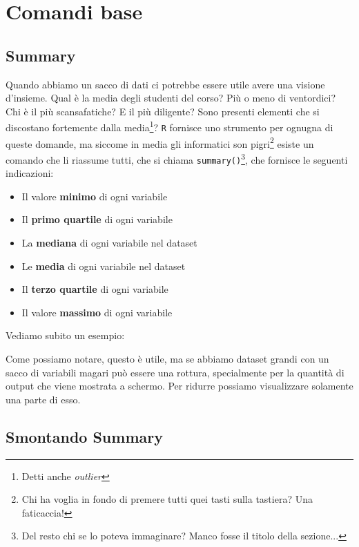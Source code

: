 \chapter{Comandi base}

\section{Summary}

Quando abbiamo un sacco di dati ci potrebbe essere utile avere una visione
d'insieme. Qual è la media degli studenti del corso? Più o meno di ventordici?
Chi è il più scansafatiche? E il più diligente? Sono presenti elementi che si
discostano fortemente dalla media\footnote{Detti anche \textit{outlier}}?
\texttt{R} fornisce uno strumento per ognugna di queste domande, ma siccome in
media gli informatici son pigri\footnote{Chi ha voglia in fondo di premere tutti
quei tasti sulla tastiera? Una faticaccia!} esiste un comando che li riassume
tutti, che si chiama \texttt{summary()}\footnote{Del resto chi se lo poteva
immaginare? Manco fosse il titolo della sezione...}, che fornisce le seguenti
indicazioni:
\begin{itemize}
 \item Il valore \textbf{minimo} di ogni variabile
 \item Il \textbf{primo quartile} di ogni variabile
 \item La \textbf{mediana} di ogni variabile nel dataset
 \item Le \textbf{media} di ogni variabile nel dataset
 \item Il \textbf{terzo quartile} di ogni variabile
 \item Il valore \textbf{massimo} di ogni variabile
\end{itemize}

Vediamo subito un esempio:



Come possiamo notare, questo è utile, ma se abbiamo dataset grandi con un sacco
di variabili magari può essere una rottura, specialmente per la quantità di
output che viene mostrata a schermo. Per ridurre possiamo visualizzare
solamente una parte di esso.



\section{Smontando Summary}


